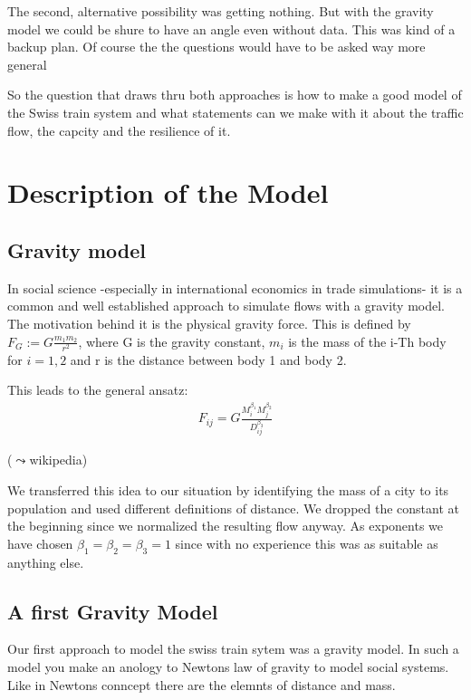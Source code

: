 \documentclass[11pt]{article}
\begin{document}
The second, alternative possibility was getting nothing. But with the gravity model we could be shure to have an angle even  without data. This was kind of a backup plan. Of course the the questions would have to be asked way more general  

So the question that draws thru both approaches is how to make a good model of the Swiss train system and what statements can we make with it about the traffic flow, the capcity and the resilience of it.     


\section{Description of the Model}
\subsection{Gravity model}
In  social science -especially in international economics in trade simulations- it is a common and well established approach to simulate flows with a gravity model. The motivation behind it is the physical gravity force. This is defined by $F_G:=G\frac{m_1 m_2}{r^2}$, where G is the gravity constant, $m_i$ is the mass of the  i-Th body for $i=1,2$ and r is the distance between body 1 and body 2.


This leads to the general ansatz:
\begin{align*}
F_{ij}=G\frac{M_i^{\beta_1}M_j^{\beta_2}}{D_{ij}^{\beta_3}}
\end{align*}

($\leadsto$wikipedia)\newline

We transferred this idea to our situation by identifying the mass of a city to its population and used different definitions of distance. We dropped the constant at the beginning since we normalized the resulting flow anyway. As exponents we have chosen $\beta_1=\beta_2=\beta_3=1$ since with no experience this was as suitable as anything else.


\subsection{A first Gravity Model}

Our first approach to model the swiss train sytem was a gravity model. In such a model you make an anology to Newtons law of gravity to model social systems. Like in Newtons conncept there are the elemnts of distance and mass.
\end{document}
